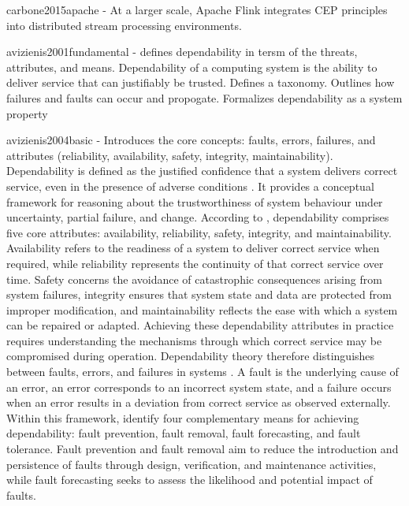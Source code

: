 carbone2015apache - At a larger scale, Apache Flink  integrates CEP principles into distributed stream processing environments. 






avizienis2001fundamental - defines dependability in tersm of the threats, attributes, and means. Dependability of a computing system is the ability to deliver service that can justifiably be trusted. Defines a taxonomy. Outlines how failures and faults can occur and propogate. Formalizes dependability as a system property


avizienis2004basic - Introduces the core concepts: faults, errors, failures, and attributes (reliability, availability, safety, integrity, maintainability). Dependability is defined as the justified confidence that a system delivers correct service, even in the presence of adverse conditions \cite{avizienis2004basic}. It provides a conceptual framework for reasoning about the trustworthiness of system behaviour under uncertainty, partial failure, and change. According to \citet{avizienis2004basic}, dependability comprises five core attributes: availability, reliability, safety, integrity, and maintainability. Availability refers to the readiness of a system to deliver correct service when required, while reliability represents the continuity of that correct service over time. Safety concerns the avoidance of catastrophic consequences arising from system failures, integrity ensures that system state and data are protected from improper modification, and maintainability reflects the ease with which a system can be repaired or adapted. Achieving these dependability attributes in practice requires understanding the mechanisms through which correct service may be compromised during operation. Dependability theory therefore distinguishes between faults, errors, and failures in systems \cite{avizienis2004basic}. A fault is the underlying cause of an error, an error corresponds to an incorrect system state, and a failure occurs when an error results in a deviation from correct service as observed externally. Within this framework, \citet{avizienis2004basic} identify four complementary means for achieving dependability: fault prevention, fault removal, fault forecasting, and fault tolerance. Fault prevention and fault removal aim to reduce the introduction and persistence of faults through design, verification, and maintenance activities, while fault forecasting seeks to assess the likelihood and potential impact of faults.


